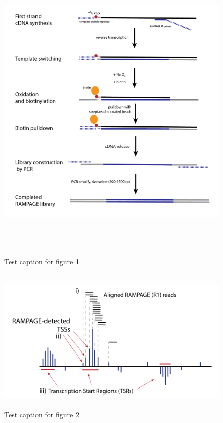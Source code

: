\documentclass[runningheads,a4paper]{llncs}
\begin{document}
\begin{linenumbers}
\begin{figure}
\centering
\includegraphics[height=15cm]{Figures/Insect_Chapter_Figure_1}
\caption{Test caption for figure 1}
\label{fig:figure1}
\end{figure}

\begin{figure}
\centering
\includegraphics[height=7cm]{Figures/Insect_Chapter_Figure_2.png}
\caption{Test caption for figure 2}
\label{fig:figure2}
\end{figure}


\end{linenumbers}
\end{document}
